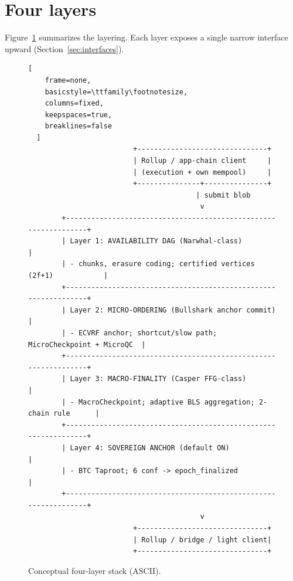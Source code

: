 \documentclass[11pt,a4paper,twoside]{report}
\theoremstyle{definition}
\begin{document}
\section{Four layers}
Figure~\ref{fig:layers} summarizes the layering. Each layer exposes a single narrow interface upward (Section~\ref{sec:interfaces}).

\begin{figure}[htbp]
  \centering
  \begin{lstlisting}[
    frame=none,
    basicstyle=\ttfamily\footnotesize,
    columns=fixed,
    keepspaces=true,
    breaklines=false
  ]
                         +-------------------------------+
                         | Rollup / app-chain client     |
                         | (execution + own mempool)     |
                         +---------------+---------------+
                                        | submit blob
                                         v
        +----------------------------------------------------------------+
        | Layer 1: AVAILABILITY DAG (Narwhal-class)                      |
        | - chunks, erasure coding; certified vertices (2f+1)            |
        +----------------------------------------------------------------+
        | Layer 2: MICRO-ORDERING (Bullshark anchor commit)              |
        | - ECVRF anchor; shortcut/slow path; MicroCheckpoint + MicroQC  |
        +----------------------------------------------------------------+
        | Layer 3: MACRO-FINALITY (Casper FFG-class)                     |
        | - MacroCheckpoint; adaptive BLS aggregation; 2-chain rule      |
        +----------------------------------------------------------------+
        | Layer 4: SOVEREIGN ANCHOR (default ON)                         |
        | - BTC Taproot; 6 conf -> epoch_finalized                       |
        +----------------------------------------------------------------+
                                         v
                         +-------------------------------+
                         | Rollup / bridge / light client|
                         +-------------------------------+
  \end{lstlisting}
  \caption{Conceptual four-layer stack (ASCII).}
  \label{fig:layers}
\end{figure}
\end{document}

